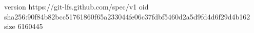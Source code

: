 version https://git-lfs.github.com/spec/v1
oid sha256:90f84b82bcc51761860f65a233044fe06c37fdbf5460d2a5d9fd4d6f29d4b162
size 6160445

